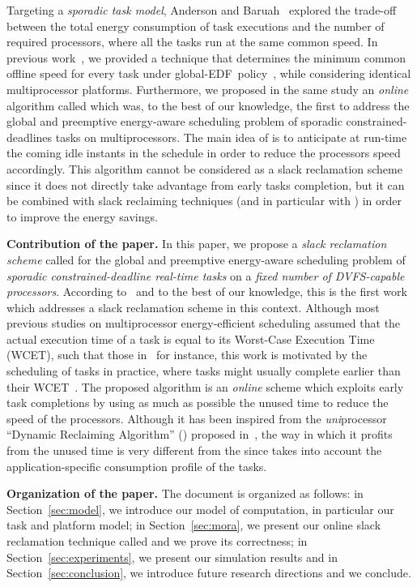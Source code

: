 \documentclass[times, 10pt,twocolumn]{article}
\newcommand{\edf}{\mbox{\textsf{EDF}}}
\begin{document}
Targeting a \emph{sporadic task model}, Anderson and Baruah~\cite{AndersonBaruah:08} explored the trade-off between the total energy consumption of task executions and the number of required processors, where all the tasks run at the same common speed. In previous work~\cite{Nelis:08}, we provided a technique that determines the minimum common offline speed for every task under global-\edf\ policy~\cite{Baker:03}, while considering identical multiprocessor platforms. Furthermore, we proposed in the same study an \emph{online} algorithm called  which was, to the best of our knowledge, the first to address the global and preemptive energy-aware scheduling problem of sporadic constrained-deadlines tasks on multiprocessors. The main idea of  is to anticipate at run-time the coming idle instants in the schedule in order to reduce the processors speed accordingly. This algorithm cannot be considered as a slack reclamation scheme since it does not directly take advantage from early tasks completion, but it can be combined with slack reclaiming techniques (and in particular with ) in order to improve the energy savings.

\textbf{Contribution of the paper.} In this paper, we propose a \emph{slack reclamation scheme} called  for the global and preemptive energy-aware scheduling problem of \emph{sporadic constrained-deadline real-time tasks} on a \emph{fixed number of DVFS-capable processors}. According to~\cite{Chen:07} and to the best of our knowledge, this is the first work which addresses a slack reclamation scheme in this context. Although most previous studies on multiprocessor energy-efficient scheduling assumed that the actual execution time of a task is equal to its Worst-Case Execution Time (WCET), such that those in~\cite{AlEnawyAydin:05,AydinYang:03,ChHsChYaPaKu:04,YangChenKuo:05} for instance, this work is motivated by the scheduling of tasks in practice, where tasks might usually complete earlier than their WCET~\cite{AyMeMoMe:04,ZhuMelhemChilders:01}. The proposed algorithm  is an \emph{online} scheme which exploits early task completions by using as much as possible the unused time to reduce the speed of the processors. Although it has been inspired from the \emph{uni}processor ``Dynamic Reclaiming Algorithm'' () proposed in~\cite{AyMeMoMe:04}, the way in which it profits from the unused time is very different from the  since  takes into account the application-specific consumption profile of the tasks.

\textbf{Organization of the paper.} The document is organized as follows: in
Section~\ref{sec:model}, we introduce our model of computation, in particular our task and platform model; 
in Section~\ref{sec:mora}, we present our online slack reclamation technique called  and we prove its correctness; 
in Section~\ref{sec:experiments}, we present our simulation results
and in Section~\ref{sec:conclusion}, we introduce future research directions and we conclude. 
\end{document}

